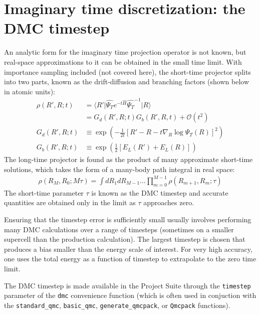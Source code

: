 \documentclass[oneside,11pt]{memoir}
\numberwithin{equation}{section}
\newcommand{\ket}[1]{\lvert #1 \rangle}
\newcommand{\bra}[1]{\langle #1 \rvert}
\newcommand{\expvalnh}[3]{\bra{#1}#2\ket{#3}}
\begin{document}
\section{Imaginary time discretization: the DMC timestep}
An analytic form for the imaginary time projection operator is not known, but 
real-space approximations to it can be obtained in the small time limit.  
With importance sampling included (not covered here), the short-time projector 
splits into two parts, known as the drift-diffusion and branching factors 
(shown below in atomic units):
\begin{align}
   \rho(R',R;t)  &= \expvalnh{R'}{\hat{\Psi_T}e^{-t\hat{H}}\hat{\Psi_T}^{-1}}{R}\\ 
    &= G_d(R',R;t)G_b(R',R,t) +\mathcal{O}(t^2) \\
  G_d(R',R;t) &\equiv \exp{\left(-\tfrac{1}{2t}\left[R'-R-t\nabla_R\log\Psi_T(R)\right]^2\right)} \\
  G_b(R',R;t) &\equiv \exp{\left(\tfrac{1}{2}\left[E_L(R')+E_L(R)\right]\right)}
\end{align}
The long-time projector is found as the product of many approximate short-time 
solutions, which takes the form of a many-body path integral in real space:
\begin{align}
  \rho(R_M,R_0; M\tau) = \int dR_1dR_{M-1}\ldots \prod_{m=0}^{M-1}\rho(R_{m+1},R_m;\tau)
\end{align}
The short-time parameter $\tau$ is known as the DMC timestep and accurate 
quantities are obtained only in the limit as $\tau$ approaches zero.

Ensuring that the timestep error is sufficiently small usually involves 
performing many DMC calculations over a range of timesteps (sometimes on 
a smaller supercell than the production calculation).  The largest timestep 
is chosen that produces a bias smaller than the energy scale of interest.  
For very high accuracy, one uses the total energy as a function of timestep to 
extrapolate to the zero time limit.

The DMC timestep is made available in the Project Suite through the 
\texttt{timestep} parameter of the \texttt{dmc} convenience function 
(which is often used in conjuction with the \texttt{standard\_qmc},  
\texttt{basic\_qmc}, \texttt{generate\_qmcpack}, or \texttt{Qmcpack} 
functions). 
\end{document}
